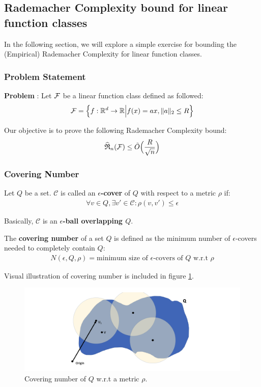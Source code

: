\subsection{Rademacher Complexity bound for linear function classes}
In the following section, we will explore a simple exercise for bounding the (Empirical) Rademacher Complexity for linear function classes.

\subsubsection{Problem Statement}
\textbf{Problem} : Let $\mathcal{F}$ be a linear function class defined as followed:
\begin{align*}
    \mathcal{F} = \Big\{ 
        f:\mathbb{R}^d \to \mathbb{R} \Big| f(x) = ax, \|a\|_2 \le R
     \Big\}
\end{align*}

\noindent Our objective is to prove the following Rademacher Complexity bound:
\begin{align*}
    \widehat{\mathfrak{R}}_n(\mathcal{F}) \le \tilde O \Big( 
        \frac{R}{\sqrt{n}}
     \Big)
\end{align*}

\subsubsection{Covering Number}
\begin{definition}
    Let $Q$ be a set. $\mathcal{C}$ is called an \textbf{$\epsilon$-cover} of $Q$ with respect to a metric $\rho$ if:
    \begin{align*}
        \forall v \in Q, \exists v'\in \mathcal{C} : \rho(v, v') \le \epsilon
    \end{align*}

    \noindent Basically, $\mathcal{C}$ is an \textbf{$\epsilon$-ball overlapping $Q$}.
\end{definition}

\begin{definition}
    The \textbf{covering number} of a set $Q$ is defined as the minimum number of $\epsilon$-covers needed to completely contain $Q$:
    \begin{align*}
        N(\epsilon, Q, \rho) = \text{minimum size of $\epsilon$-covers of $Q$ w.r.t $\rho$}
    \end{align*}

    \noindent Visual illustration of covering number is included in figure \ref{fig:covering_number}.
\end{definition}

\begin{figure}[ht]
    \centering
    \includegraphics[width=\textwidth]{figures/covering_number.png}
    \caption{Covering number of $Q$ w.r.t a metric $\rho$.}
    \label{fig:covering_number}
\end{figure}

